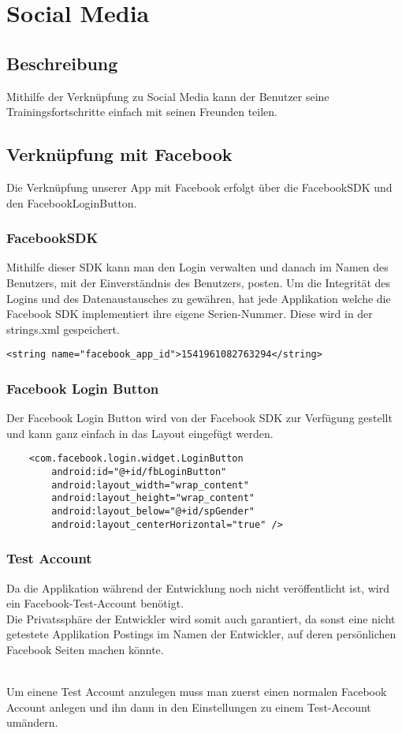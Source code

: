 \documentclass[FIPLY_base.tex]{subfiles}
\author{Gerald Irsiegler}
\date{13. März 2016}
\begin{document}
\section{Social Media}
\subsection{Beschreibung}
Mithilfe der Verknüpfung zu Social Media kann der Benutzer seine Trainingsfortschritte einfach mit seinen Freunden teilen. 
\subsection{Verknüpfung mit Facebook}
Die Verknüpfung unserer App mit Facebook erfolgt über die FacebookSDK und den FacebookLoginButton.
\subsubsection{FacebookSDK}
Mithilfe dieser SDK kann man den Login verwalten und danach im Namen des Benutzers, mit der Einverständnis des Benutzers, posten.
Um die Integrität des Logins und des Datenaustausches zu gewähren, hat jede Applikation welche die Facebook SDK implementiert ihre eigene Serien-Nummer.
Diese wird in der strings.xml gespeichert.
\begin{lstlisting}
<string name="facebook_app_id">1541961082763294</string>
\end{lstlisting}
\subsubsection{Facebook Login Button}
Der Facebook Login Button wird von der Facebook SDK zur Verfügung gestellt und kann ganz einfach in das Layout eingefügt werden.
\begin{lstlisting}
    <com.facebook.login.widget.LoginButton
        android:id="@+id/fbLoginButton"
        android:layout_width="wrap_content"
        android:layout_height="wrap_content"
        android:layout_below="@+id/spGender"
        android:layout_centerHorizontal="true" />
\end{lstlisting}

\newpage
\subsubsection{Test Account}
Da die Applikation während der Entwicklung noch nicht veröffentlicht ist, wird ein Facebook-Test-Account benötigt. \ \\
Die Privatssphäre der Entwickler wird somit auch garantiert, da sonst eine nicht getestete Applikation Postings im Namen der Entwickler, auf deren persönlichen Facebook Seiten machen könnte.

\ \\
Um einene Test Account anzulegen muss man zuerst einen normalen Facebook Account anlegen und ihn dann in den Einstellungen zu einem Test-Account umändern.
\end{document}
